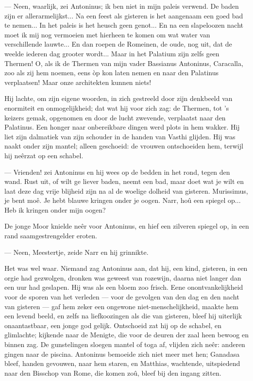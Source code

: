 \documentclass[a4paper, 12pt, oneside, dutch]{article}
\begin{document}
--- Neen, waarlijk, zei Antoninus; ik ben niet in mijn paleis verwend. De baden zijn er allerarmelijkst... Na een feest als gisteren is het aangenaam een goed bad te nemen... In het paleis is het heusch geen genot... En na een slapeloozen nacht moet ik mij nog vermoeien met hierheen te komen om wat water van verschillende lauwte... En dan roepen de Romeinen, de oude, nog uit, dat de weelde iederen dag grooter wordt... Maar in het Palatium zijn zelfs geen Thermen! O, als ik de Thermen van mijn vader Bassianus Antoninus, Caracalla, zoo als zij hem noemen, eens òp kon laten nemen en naar den Palatinus verplaatsen! Maar onze architekten kunnen niets!

Hij lachte, om zijn eigene woorden, in zich gestreeld door zijn denkbeeld van enormiteit en onmogelijkheid; dat wat hij voor zich zag: de Thermen, tot 's keizers gemak, opgenomen en door de lucht zwevende, verplaatst naar den Palatinus. Een honger naar onbereikbare dingen werd plots in hem wakker. Hij liet zijn dalmatiek van zijn schouder in de handen van Vasthi glijden. Hij was naakt onder zijn mantel; alleen geschoeid: de vrouwen ontschoeiden hem, terwijl hij neêrzat op een schabel.

--- Vrienden! zei Antoninus en hij wees op de bedden in het rond, tegen den wand. Rust uit, of wilt ge liever baden, neemt een bad, maar doet wat je wilt en laat deze dag vrije blijheid zijn na al de woelige dolheid van gisteren. Murissimus, je bent moê. Je hebt blauwe kringen onder je oogen. Narr, hoû een spiegel op... Heb ik kringen onder mijn oogen?

De jonge Moor knielde neêr voor Antoninus, en hief een zilveren spiegel op, in een rand saamgestrengelder eroten.

--- Neen, Meestertje, zeide Narr en hij grinnikte.

Het was wel waar. Niemand zag Antoninus aan, dat hij, een kind, gisteren, in een orgie had gezwolgen, dronken was geweest van rozewijn, daarna niet langer dan een uur had geslapen. Hij was als een bloem zoo frisch. Eene onontvankelijkheid voor de sporen van het verleden --- voor de gevolgen van den dag en den nacht van gisteren --- gaf hem zeker een ongewone niet-menschelijkheid, maakte hem een levend beeld, en zelfs na liefkoozingen als die van gisteren, bleef hij uiterlijk onaantastbaar, een jonge god gelijk. Ontschoeid zat hij op de schabel, en glimlachte; kijkende naar de Menigte, die voor de deuren der zaal heen bewoog en binnen zag. De gunstelingen sloegen mantel of toga af, vlijden zich neêr: anderen gingen naar de piscina. Antoninus bemoeide zich niet meer met hen; Ganadasa bleef, handen gevouwen, naar hem staren, en Matthias, wachtende, uitspiedend naar den Bisschop van Rome, die komen zoû, bleef bij den ingang zitten.
\end{document}
